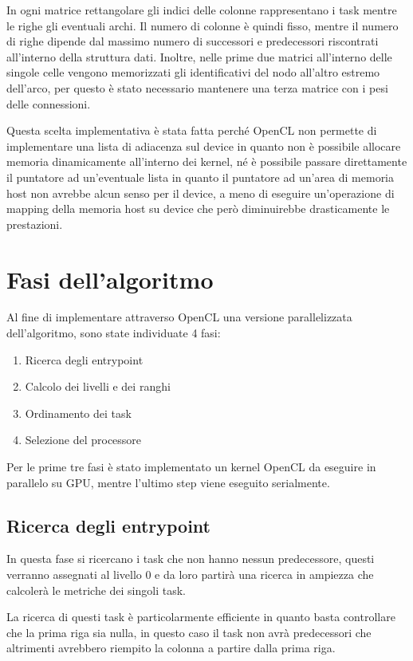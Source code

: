 In ogni matrice rettangolare gli indici delle colonne rappresentano i task mentre le righe gli eventuali archi. Il numero di colonne è quindi fisso, mentre il numero di righe dipende dal massimo numero di successori e predecessori riscontrati all'interno della struttura dati. Inoltre, nelle prime due matrici all'interno delle singole celle vengono memorizzati gli identificativi del nodo all'altro estremo dell'arco, per questo è stato necessario mantenere una terza matrice con i pesi delle connessioni.

Questa scelta implementativa è stata fatta perché OpenCL non permette di implementare una lista di adiacenza sul device in quanto non è possibile allocare memoria dinamicamente all'interno dei kernel, né è possibile passare direttamente il puntatore ad un'eventuale lista in quanto il puntatore ad un'area di memoria host non avrebbe alcun senso per il device, a meno di eseguire un'operazione di mapping della memoria host su device che però diminuirebbe drasticamente le prestazioni.


\section{Fasi dell'algoritmo}
Al fine di implementare attraverso OpenCL una versione parallelizzata dell'algoritmo, sono state individuate 4 fasi:

\begin{enumerate}
	\item Ricerca degli entrypoint
	\item Calcolo dei livelli e dei ranghi
	\item Ordinamento dei task
	\item Selezione del processore
\end{enumerate}
Per le prime tre fasi è stato implementato un kernel OpenCL da eseguire in parallelo su GPU, mentre l'ultimo step viene eseguito serialmente.

\subsection{Ricerca degli entrypoint}
In questa fase si ricercano i task che non hanno nessun predecessore, questi verranno assegnati al livello 0 e da loro partirà una ricerca in ampiezza che calcolerà le metriche dei singoli task.

La ricerca di questi task è particolarmente efficiente in quanto basta controllare che la prima riga sia nulla, in questo caso il task non avrà predecessori che altrimenti avrebbero riempito la colonna a partire dalla prima riga.\\

